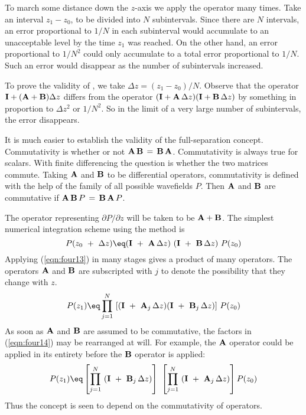 \par
To march some distance down the $z$-axis we
apply the operator many times.
Take an interval  $z_1-z_0$,  to be
divided into  $N$  subintervals.
Since there are  $N$  intervals,
an error proportional to  $1/N$  in each subinterval would accumulate to an 
unacceptable level by the time  $z_1$  was reached.
On the other hand, an error
proportional to  $ 1 / N^2 $  could
only accumulate to a total error
proportional to  $1/N$.
Such an error would disappear as the
number of subintervals increased.
\par
To prove the validity of , we
take  $\Delta z=( z_1 - z_0 ) / N$.
Observe that the operator  ${\bf I} + ( {\bf A} + {\bf B} ) \Delta z$  differs from the
operator  $( {\bf I} + {\bf A} \, \Delta z)( {\bf I} + {\bf B} \, \Delta z)$  by
something in proportion to  $\Delta z^2$  or  $1/N^2$.
So in the limit of a very large number of
subintervals, the error disappears.
\par
It is much easier to establish the validity of the full-separation concept.
Commutativity is whether or not  ${\bf A} \, {\bf B} \, = \, {\bf B} \, {\bf A}$.
Commutativity is always true for scalars.
With finite differencing the question is whether the two matrices commute.
Taking  ${\bf A}$  and  ${\bf B}$  to be differential operators,
commutativity is defined with the help of
the family of all possible wavefields  $P$.
Then  ${\bf A}$  and  ${\bf B}$  are commutative if
$ {\bf A} \, {\bf B} \, P \, = \, {\bf B} \, {\bf A} \, P$.
\par
The operator representing  $\partial P / \partial z$  will
be taken to be  ${\bf A} + {\bf B}$.
The simplest numerical
integration scheme using the  method is
\begin{equation}
P( z_0\ +\ \Delta z)\eq ( \I\ +\ \A \, \Delta z )\ ( \I\ +\ \B \, \Delta z )
\ P ( z_0 )
\label{eqn:four13}
\end{equation}
Applying (\ref{eqn:four13}) in many stages gives a
product of many operators.
The operators  ${\bf A}$  and  ${\bf B}$  are subscripted with  $j$  to 
denote the possibility that they change with  $z$.
\begin{equation}
P ( z_1 ) \eq  \prod_{j=1}^N\ 
[ ( \I\ +\ \A_j \, \Delta z )
( \I\ +\ \B_j \, \Delta z ) ]
\ P ( z_0 )
\label{eqn:four14}
\end{equation}
As soon as  ${\bf A}$  and  ${\bf B}$  are assumed
to be commutative, the factors in (\ref{eqn:four14})
may be rearranged at will.
For example,
the  ${\bf A}$  operator could be
applied in its entirety before the  ${\bf B}$  operator
is applied:
\begin{equation}
P ( z_1 ) \eq \left[  \prod_{j=1}^N\ ( \I\ +\ \B_j \, \Delta z ) \right]\ 
\left[  \prod_{j=1}^N\ ( \I\ +\ \A_j \, \Delta z) \right]
P ( z_0 )
\label{eqn:four15}
\end{equation}
Thus the
 concept is
seen to depend on the commutativity of
operators.



